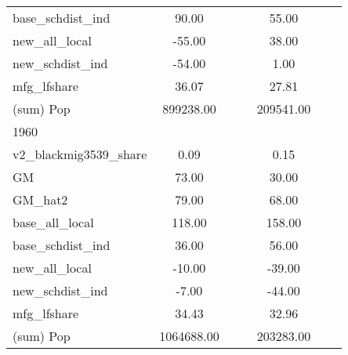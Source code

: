 \begin{table}[htbp]
\begin{tabular}{l*{2}{ccc}}
base\_schdist\_ind    &       90.00&            &            &       55.00&            &            \\
new\_all\_local       &      -55.00&            &            &       38.00&            &            \\
new\_schdist\_ind     &      -54.00&            &            &        1.00&            &            \\
mfg\_lfshare         &       36.07&            &            &       27.81&            &            \\
(sum) Pop           &   899238.00&            &            &   209541.00&            &            \\
\midrule
1960                &            &            &            &            &            &            \\
v2\_blackmig3539\_share&        0.09&            &            &        0.15&            &            \\
GM                  &       73.00&            &            &       30.00&            &            \\
GM\_hat2             &       79.00&            &            &       68.00&            &            \\
base\_all\_local      &      118.00&            &            &      158.00&            &            \\
base\_schdist\_ind    &       36.00&            &            &       56.00&            &            \\
new\_all\_local       &      -10.00&            &            &      -39.00&            &            \\
new\_schdist\_ind     &       -7.00&            &            &      -44.00&            &            \\
mfg\_lfshare         &       34.43&            &            &       32.96&            &            \\
(sum) Pop           &  1064688.00&            &            &   203283.00&            &            \\
\bottomrule
\end{tabular}
\end{table}
